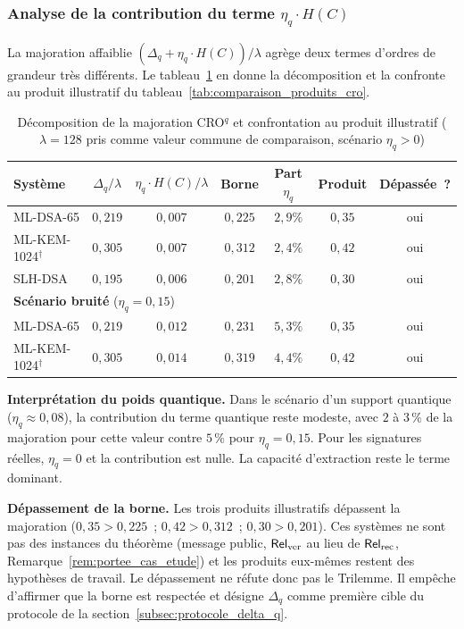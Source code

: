 \begin{sloppypar}
\subsubsection{Analyse de la contribution du terme $\eta_q \cdot H(C)$}

La majoration affaiblie $(\Delta_q + \eta_q \cdot H(C))/\lambda$ agr\`ege deux
termes d'ordres de grandeur tr\`es diff\'erents. Le
tableau~\ref{tab:decomposition_borne_pq} en donne la d\'ecomposition et la
confronte au produit illustratif du tableau~\ref{tab:comparaison_produits_cro}.

\begin{table}[htbp]
\centering
\caption{D\'ecomposition de la majoration CRO$^q$ et confrontation au produit
         illustratif ($\lambda = 128$ pris comme valeur commune de comparaison, sc\'enario $\eta_q > 0$)}
\label{tab:decomposition_borne_pq}
\small
\begin{tabular}{@{}lcccccc@{}}
\toprule
\textbf{Syst\`eme} & $\Delta_q/\lambda$ & $\eta_q \cdot H(C)/\lambda$ &
\textbf{Borne} & \textbf{Part $\eta_q$} & \textbf{Produit} & \textbf{D\'epass\'ee~?} \\
\midrule
ML-DSA-65 & $0{,}219$ & $0{,}007$ & $0{,}225$ & $2{,}9\%$ & $0{,}35$ & oui \\
ML-KEM-1024$^\dagger$ & $0{,}305$ & $0{,}007$ & $0{,}312$ & $2{,}4\%$ & $0{,}42$ & oui \\
SLH-DSA & $0{,}195$ & $0{,}006$ & $0{,}201$ & $2{,}8\%$ & $0{,}30$ & oui \\
\midrule
\multicolumn{7}{l}{\textbf{Sc\'enario bruit\'e} ($\eta_q = 0{,}15$)} \\
\midrule
ML-DSA-65 & $0{,}219$ & $0{,}012$ & $0{,}231$ & $5{,}3\%$ & $0{,}35$ & oui \\
ML-KEM-1024$^\dagger$ & $0{,}305$ & $0{,}014$ & $0{,}319$ & $4{,}4\%$ & $0{,}42$ & oui \\
\bottomrule
\end{tabular}
\end{table}

\noindent\textbf{Interpr\'etation du poids quantique.} Dans le sc\'enario
d'un support quantique ($\eta_q \approx 0{,}08$), la contribution du terme
quantique reste modeste, avec $2$ \`a $3\,\%$ de la majoration pour cette valeur contre $5\,\%$ pour
$\eta_q = 0{,}15$. Pour les signatures r\'eelles, $\eta_q = 0$ et la contribution
est nulle. La capacit\'e d'extraction reste le terme dominant.

\noindent\textbf{D\'epassement de la borne.} Les trois produits illustratifs
d\'epassent la majoration ($0{,}35 > 0{,}225$~; $0{,}42 > 0{,}312$~;
$0{,}30 > 0{,}201$). Ces syst\`emes ne sont
pas des instances du th\'eor\`eme (message public, $\mathsf{Rel}_{\mathrm{ver}}$ au lieu de $\mathsf{Rel}_{\mathrm{rec}}$,
Remarque~\ref{rem:portee_cas_etude}) et les produits eux-m\^emes restent des
hypoth\`eses de travail. Le d\'epassement ne r\'efute donc pas le Trilemme. Il
emp\^eche d'affirmer que la borne est respect\'ee et d\'esigne $\Delta_q$ comme
premi\`ere cible du protocole de la section~\ref{subsec:protocole_delta_q}.

\end{sloppypar}

